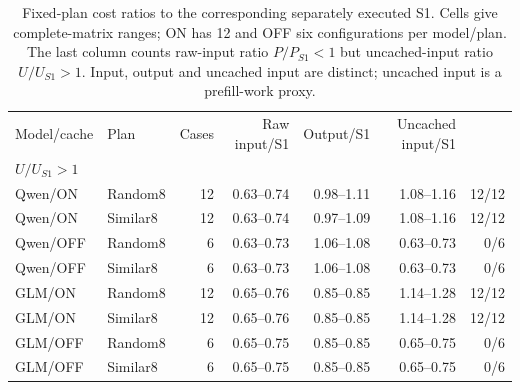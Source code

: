 \begin{table}[t]
\centering\small
\caption{Fixed-plan cost ratios to the corresponding separately executed S1. Cells give complete-matrix ranges; ON has 12 and OFF six configurations per model/plan. The last column counts raw-input ratio $P/P_{S1}<1$ but uncached-input ratio $U/U_{S1}>1$. Input, output and uncached input are distinct; uncached input is a prefill-work proxy.}
\label{tab:cache_costs}
\begin{tabular}{llrrrrr}
\toprule
Model/cache & Plan & Cases & Raw input/S1 & Output/S1 & Uncached input/S1 & \shortstack{$P/P_{S1}<1$,\\$U/U_{S1}>1$} \\
\midrule
Qwen/ON & Random8 & 12 & 0.63--0.74 & 0.98--1.11 & 1.08--1.16 & 12/12 \\
Qwen/ON & Similar8 & 12 & 0.63--0.74 & 0.97--1.09 & 1.08--1.16 & 12/12 \\
Qwen/OFF & Random8 & 6 & 0.63--0.73 & 1.06--1.08 & 0.63--0.73 & 0/6 \\
Qwen/OFF & Similar8 & 6 & 0.63--0.73 & 1.06--1.08 & 0.63--0.73 & 0/6 \\
\midrule
GLM/ON & Random8 & 12 & 0.65--0.76 & 0.85--0.85 & 1.14--1.28 & 12/12 \\
GLM/ON & Similar8 & 12 & 0.65--0.76 & 0.85--0.85 & 1.14--1.28 & 12/12 \\
GLM/OFF & Random8 & 6 & 0.65--0.75 & 0.85--0.85 & 0.65--0.75 & 0/6 \\
GLM/OFF & Similar8 & 6 & 0.65--0.75 & 0.85--0.85 & 0.65--0.75 & 0/6 \\
\bottomrule
\end{tabular}
\end{table}
